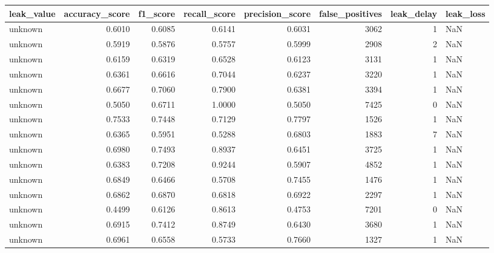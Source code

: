 \begin{tabular}{lrrrrrrl}
\toprule
leak\_value & accuracy\_score & f1\_score & recall\_score & precision\_score & false\_positives & leak\_delay & leak\_loss \\
\midrule
unknown & 0.6010 & 0.6085 & 0.6141 & 0.6031 & 3062 & 1 & NaN \\
unknown & 0.5919 & 0.5876 & 0.5757 & 0.5999 & 2908 & 2 & NaN \\
unknown & 0.6159 & 0.6319 & 0.6528 & 0.6123 & 3131 & 1 & NaN \\
unknown & 0.6361 & 0.6616 & 0.7044 & 0.6237 & 3220 & 1 & NaN \\
unknown & 0.6677 & 0.7060 & 0.7900 & 0.6381 & 3394 & 1 & NaN \\
unknown & 0.5050 & 0.6711 & 1.0000 & 0.5050 & 7425 & 0 & NaN \\
unknown & 0.7533 & 0.7448 & 0.7129 & 0.7797 & 1526 & 1 & NaN \\
unknown & 0.6365 & 0.5951 & 0.5288 & 0.6803 & 1883 & 7 & NaN \\
unknown & 0.6980 & 0.7493 & 0.8937 & 0.6451 & 3725 & 1 & NaN \\
unknown & 0.6383 & 0.7208 & 0.9244 & 0.5907 & 4852 & 1 & NaN \\
unknown & 0.6849 & 0.6466 & 0.5708 & 0.7455 & 1476 & 1 & NaN \\
unknown & 0.6862 & 0.6870 & 0.6818 & 0.6922 & 2297 & 1 & NaN \\
unknown & 0.4499 & 0.6126 & 0.8613 & 0.4753 & 7201 & 0 & NaN \\
unknown & 0.6915 & 0.7412 & 0.8749 & 0.6430 & 3680 & 1 & NaN \\
unknown & 0.6961 & 0.6558 & 0.5733 & 0.7660 & 1327 & 1 & NaN \\
\bottomrule
\end{tabular}
